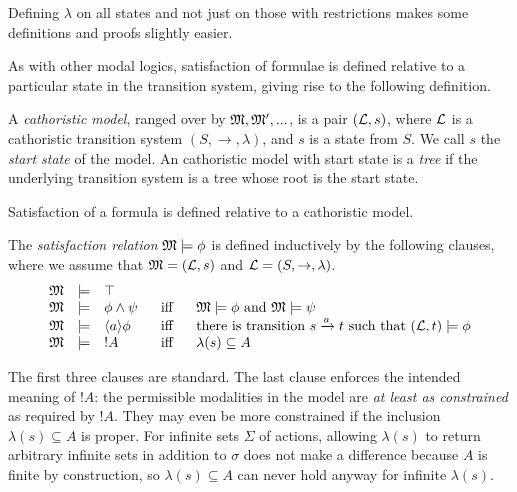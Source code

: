 \NI Defining $\lambda$ on all states and not just on those with
restrictions makes some definitions and proofs slightly easier.

As with other modal logics, satisfaction of formulae is defined
relative to a particular state in the transition system, giving
rise to the following definition.

\begin{definition}
A \emph{cathoristic model}, ranged over by $\frak{M}, \frak{M}', ...$, is a
pair $(\mathcal{L}, s)$, where $\mathcal{L}$ is a cathoristic transition system $(S,
\rightarrow, \lambda)$, and $s$ is a state from $S$. We call $s$ the
\emph{start state} of the model.  An cathoristic model with start
state is a \emph{tree} if the underlying transition system is a tree
whose root is the start state.
\end{definition}

\NI Satisfaction of a formula is defined relative to a cathoristic model.

\begin{definition}\label{ELsatisfaction}
The \emph{satisfaction relation} $\frak{M} \models \phi$ is defined
inductively by the following clauses, where we assume that $\frak{M} =
(\mathcal{L}, s)$ and $\mathcal{L} = (S, \rightarrow, \lambda)$.
\[
\begin{array}{lclcl}
  \frak{M} & \models & \top   \\
  \frak{M} & \models & \phi \land \psi &\ \mbox{ iff } \ & \frak{M}  \models \phi \mbox { and } \frak{M} \models \psi  \\
  \frak{M} & \models & \langle a \rangle \phi & \mbox{ iff } & \text{there is transition } s \xrightarrow{a} t \mbox { such that } (\mathcal{L}, t) \models \phi  \\
  \frak{M} & \models & ! A &\mbox{ iff } & \lambda(s) \subseteq A
\end{array}
\]
\end{definition}

\NI The first three clauses are standard. The last clause enforces the
intended meaning of $!A$: the permissible modalities in the model are
\emph{at least as constrained} as required by $!A$. They may even be
more constrained if the inclusion $\lambda(s) \subseteq A$ is
proper. For infinite sets $\Sigma$ of actions, allowing $\lambda(s)$
to return arbitrary infinite sets in addition to $\sigma$ does not
make a difference because $A$ is finite by construction, so
$\lambda(s) \subseteq A$ can never hold anyway for infinite
$\lambda(s)$.




